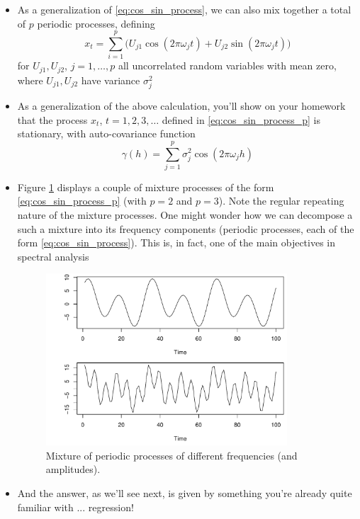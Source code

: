 \documentclass{article}
\begin{document}
\begin{itemize}
\item As a generalization of \eqref{eq:cos_sin_process}, we can also mix
  together a total of $p$ periodic processes, defining
  \begin{equation}
  \label{eq:cos_sin_process_p}
  x_t = \sum_{i=1}^p \Big( U_{j1} \cos(2\pi\omega_j t) + U_{j2}
  \sin(2\pi\omega_j t) \Big) 
  \end{equation}
  for $U_{j1}, U_{j2}$, $j = 1,\dots,p$ all uncorrelated random variables with
  mean zero, where $U_{j1}, U_{j2}$ have variance $\sigma^2_j$

\item As a generalization of the above calculation, you'll show on your homework
  that the process $x_t$, $t = 1,2,3,\dots$ defined in
  \eqref{eq:cos_sin_process_p} is stationary, with auto-covariance function   
  \[
  \gamma(h) = \sum_{j=1}^p \sigma^2_j \cos(2\pi\omega_j h)
  \]

\item Figure \ref{fig:cos_mixture} displays a couple of mixture processes of the 
  form \eqref{eq:cos_sin_process_p} (with $p=2$ and $p=3$). Note the regular
  repeating nature of the mixture processes. One might wonder how we can
  decompose a such a mixture into its frequency components (periodic processes,
  each of the form \eqref{eq:cos_sin_process}). This is, in fact, one of the
  main objectives in spectral analysis

\begin{figure}[htb]
\centering
\includegraphics[width=0.85\textwidth]{fig/cos-mixture-1.pdf}
\caption{Mixture of periodic processes of different frequencies (and
  amplitudes).}  
\label{fig:cos_mixture}
\end{figure}

\item And the answer, as we'll see next, is given by something you're already
  quite familiar with ... regression! 
\end{itemize}
\end{document}
